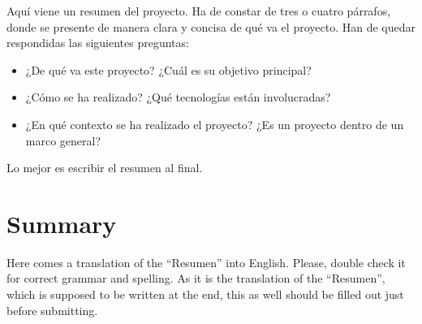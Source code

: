 \documentclass[a4paper, 12pt]{book}
\begin{document}
	Aquí viene un resumen del proyecto.
	Ha de constar de tres o cuatro párrafos, donde se presente de manera clara y concisa de qué va el proyecto. 
	Han de quedar respondidas las siguientes preguntas:
	
	\begin{itemize}
		\item ¿De qué va este proyecto? ¿Cuál es su objetivo principal?
		\item ¿Cómo se ha realizado? ¿Qué tecnologías están involucradas?
		\item ¿En qué contexto se ha realizado el proyecto? ¿Es un proyecto dentro de un marco general?
	\end{itemize}
	
	Lo mejor es escribir el resumen al final.
	
	
	\chapter*{Summary}
	
	Here comes a translation of the ``Resumen'' into English. 
	Please, double check it for correct grammar and spelling.
	As it is the translation of the ``Resumen'', which is supposed to be written at the end, this as well should be filled out just before submitting.
	
	
	
	
	\tableofcontents 
	\cleardoublepage
	\listoffigures %
	
\end{document}
